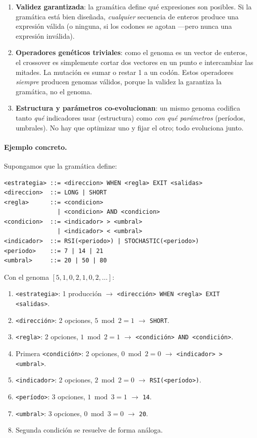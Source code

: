 \documentclass[12pt,a4paper]{article}
\begin{document}
\begin{enumerate}
\item \textbf{Validez garantizada}: la gramática define qué expresiones son posibles.
  Si la gramática está bien diseñada, \textit{cualquier} secuencia de enteros produce
  una expresión válida (o ninguna, si los codones se agotan ---pero nunca una expresión
  inválida).

\item \textbf{Operadores genéticos triviales}: como el genoma es un vector de enteros,
  el crossover es simplemente cortar dos vectores en un punto e intercambiar las
  mitades. La mutación es sumar o restar 1 a un codón. Estos operadores \textit{siempre}
  producen genomas válidos, porque la validez la garantiza la gramática, no el genoma.

\item \textbf{Estructura y parámetros co-evolucionan}: un mismo genoma codifica tanto
  \textit{qué} indicadores usar (estructura) como \textit{con qué parámetros}
  (períodos, umbrales). No hay que optimizar uno y fijar el otro; todo evoluciona junto.
\end{enumerate}

\paragraph{Ejemplo concreto.} Supongamos que la gramática define:

\begin{lstlisting}[style=bnfstyle]
<estrategia> ::= <direccion> WHEN <regla> EXIT <salidas>
<direccion>  ::= LONG | SHORT
<regla>      ::= <condicion>
               | <condicion> AND <condicion>
<condicion>  ::= <indicador> > <umbral>
               | <indicador> < <umbral>
<indicador>  ::= RSI(<periodo>) | STOCHASTIC(<periodo>)
<periodo>    ::= 7 | 14 | 21
<umbral>     ::= 20 | 50 | 80
\end{lstlisting}

Con el genoma $[5, 1, 0, 2, 1, 0, 2, \ldots]$:
\begin{enumerate}
\item \texttt{<estrategia>}: 1 producción $\to$ \texttt{<dirección> WHEN <regla> EXIT <salidas>}.
\item \texttt{<dirección>}: 2 opciones, $5 \bmod 2 = 1$ $\to$ \texttt{SHORT}.
\item \texttt{<regla>}: 2 opciones, $1 \bmod 2 = 1$ $\to$ \texttt{<condición> AND <condición>}.
\item Primera \texttt{<condición>}: 2 opciones, $0 \bmod 2 = 0$ $\to$
  \texttt{<indicador> > <umbral>}.
\item \texttt{<indicador>}: 2 opciones, $2 \bmod 2 = 0$ $\to$ \texttt{RSI(<período>)}.
\item \texttt{<período>}: 3 opciones, $1 \bmod 3 = 1$ $\to$ \texttt{14}.
\item \texttt{<umbral>}: 3 opciones, $0 \bmod 3 = 0$ $\to$ \texttt{20}.
\item Segunda condición se resuelve de forma análoga.
\end{enumerate}
\end{document}
